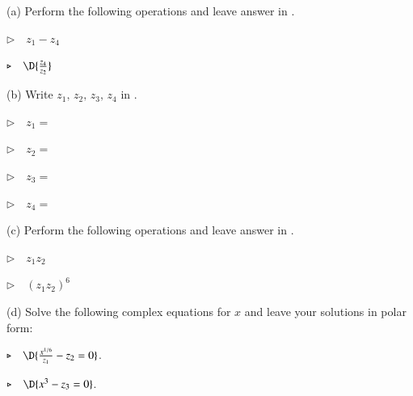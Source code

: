 \documentclass[11pt]{article}
\begin{document}
\vspace{0.01cm}
 
(a) Perform the following operations and leave answer in .

\vspace{0.3cm}

\qquad $\triangleright \quad z_1 - z_4$

\vspace{1.0cm}

\qquad $\triangleright \quad \D{\frac{z_4}{z_2}}$

\vspace{1.0cm}

(b) Write $z_1, \, z_2, \, z_3, \, z_4$ in .

\vspace{0.3cm}

\qquad $\triangleright \quad z_1 = $

\vspace{1.2cm}

\qquad $\triangleright \quad z_2 = $

\vspace{1.2cm}

\qquad $\triangleright \quad z_3 = $

\vspace{1.2cm}

\qquad $\triangleright \quad z_4 = $

\vspace{1.2cm}

(c) Perform the following operations and leave answer in . 

\vspace{0.5cm}

\qquad $\triangleright \quad z_1z_2$

\vspace{1.0cm}

\qquad $\triangleright \quad (z_1z_2)^6$

\vspace{1.0cm}

(d) Solve the following complex equations for $x$ and leave your solutions in polar form: 

\qquad $\triangleright \quad \D{\frac{x^{1/6}}{z_1} - z_2 = 0}$.

\vspace{2.0cm}

\qquad $\triangleright \quad \D{x^3-z_3=0}$.

\thispagestyle{empty}
\newpage
\thispagestyle{empty}
\end{document}
